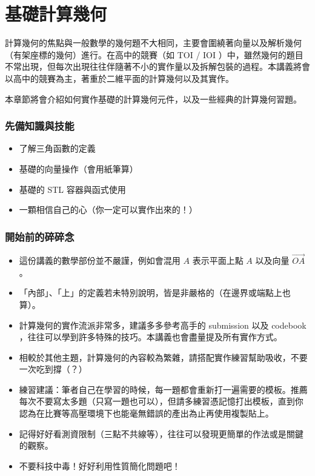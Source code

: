 \documentclass[main.tex]{subfiles}
\begin{document}
\chapter{基礎計算幾何}

計算幾何的焦點與一般數學的幾何題不大相同，主要會圍繞著向量以及解析幾何（有架座標的幾何）進行。在高中的競賽（如 TOI / IOI ）中，雖然幾何的題目不常出現，但每次出現往往伴隨著不小的實作量以及拆解包裝的過程。本講義將會以高中的競賽為主，著重於二維平面的計算幾何以及其實作。

本章節將會介紹如何實作基礎的計算幾何元件，以及一些經典的計算幾何習題。

\subsection{先備知識與技能}

\begin{itemize}
	\item 了解三角函數的定義
	\item 基礎的向量操作（會用紙筆算）
	\item 基礎的 STL 容器與函式使用
	\item 一顆相信自己的心（你一定可以實作出來的！）
\end{itemize}

\subsection{開始前的碎碎念}

\begin{itemize}
	\item 這份講義的數學部份並不嚴謹，例如會混用 $A$ 表示平面上點 $A$ 以及向量 $\vec{OA}$ 。
	\item 「內部」、「上」的定義若未特別說明，皆是非嚴格的（在邊界或端點上也算）。
	\item 計算幾何的實作流派非常多，建議多多參考高手的 submission 以及 codebook ，往往可以學到許多特殊的技巧。本講義也會盡量提及所有實作方式。
	\item 相較於其他主題，計算幾何的內容較為繁雜，請搭配實作練習幫助吸收，不要一次吃到撐（？）
	\item 練習建議：筆者自己在學習的時候，每一題都會重新打一遍需要的模板。推薦每次不要寫太多題（只寫一題也可以），但請多練習憑記憶打出模板，直到你認為在比賽等高壓環境下也能毫無錯誤的產出為止再使用複製貼上。
	\item 記得好好看測資限制（三點不共線等），往往可以發現更簡單的作法或是關鍵的觀察。
	\item 不要科技中毒！好好利用性質簡化問題吧！
\end{itemize}
\end{document}

